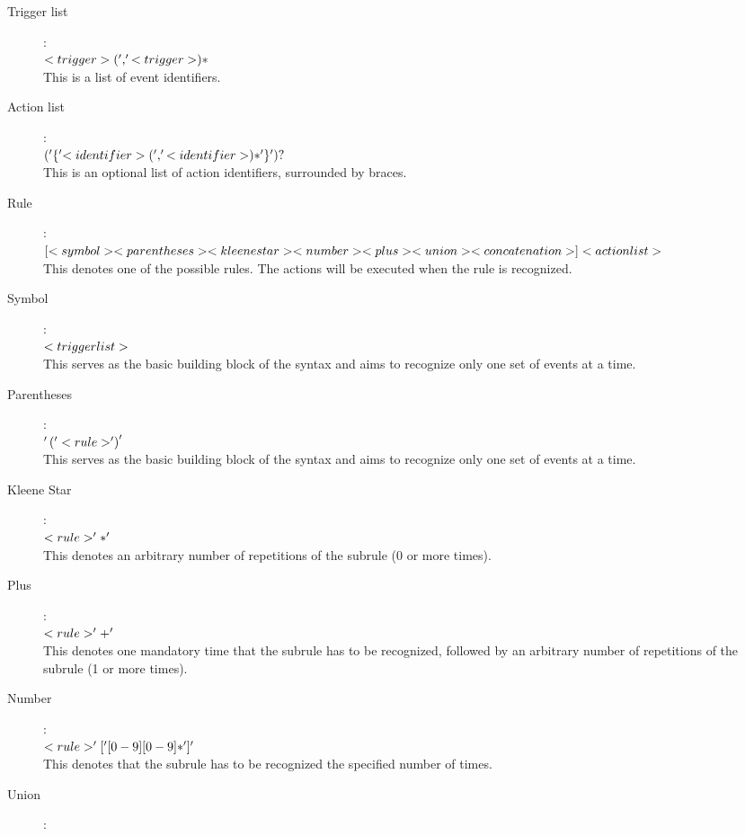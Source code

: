 \documentclass[a4paper,11pt]{report}
\begin{document}
\begin{description}
			\item[Trigger list]:\\
				$<trigger>(','<trigger>)*$\\
				This is a list of event identifiers.
			\item[Action list]:\\
				$('\{' <identifier>(','<identifier>)*  '\}')?$\\
				This is an optional list of action identifiers, surrounded by braces.	
			\item[Rule]:\\ 
				$[<symbol> <parentheses> <kleenestar> <number> <plus> <union> <concatenation>] <actionlist>$\\
				This denotes one of the possible rules. The actions will be executed when the rule is recognized.
			\item[Symbol]:\\ 
				$<triggerlist>$\\
				This serves as the basic building block of the syntax and aims to recognize only one set of events at a time.
			\item[Parentheses]:\\ $'\left(' <rule> '\right)'$\\
				This serves as the basic building block of the syntax and aims to recognize only one set of events at a time.
			\item[Kleene Star]:\\ 
				$<rule> '*'$\\
				This denotes an arbitrary number of repetitions of the subrule (0 or more times).
			\item[Plus]:\\ 
				$<rule> '+'$\\
				This denotes one mandatory time that the subrule has to be recognized, followed by an arbitrary number of repetitions of the subrule (1 or more times).
			\item[Number]:\\
				$<rule> '[' [0-9][0-9]* ']' $\\
				This denotes that the subrule has to be recognized the specified number of times.
			\item[Union]:\\ 

\end{description}
\end{document}
